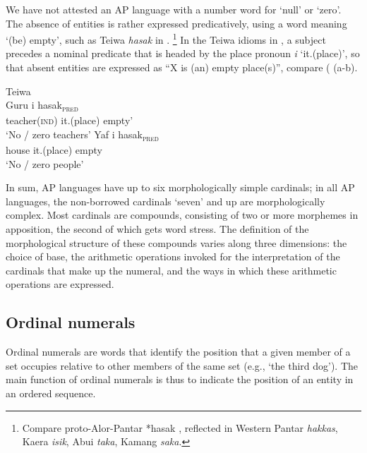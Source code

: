 We have not attested an AP language with a number word for `null' or `zero'. The absence of entities is rather expressed predicatively, using a word meaning `(be) empty', such as Teiwa \textit{hasak} in .
\footnote{Compare proto-Alor-Pantar *hasak \citep{HoltonRobinsonTVhistory}, reflected in Western Pantar \textit{hakkas}, Kaera \textit{isik}, Abui \textit{taka}, Kamang \textit{saka}.} In the Teiwa idioms in , a subject precedes a nominal predicate that is headed by the place pronoun \textit{i} `it.(place)', so that absent entities are expressed as ``X is (an) empty place(s)'', compare ( (a-b).


\ea%
\label{bkm:Ref355363568}
{\upshape Teiwa}\\
\ea
\label{ex:8:1234}
\gll Guru       {\ob}i       hasak{\cb}\textsubscript{\upshape\textsc{pred}} \\  
     teacher\textsc{(ind)}   it.(place)    empty'  \\
\glt  `No / zero teachers' 
\ex
\gll Yaf {\ob}i     hasak{\cb}\textsubscript{\upshape\textsc{pred}} \\
    house      it.(place)   empty\\
\glt    `No / zero people' 
\z
\z

In sum, AP languages have up to six morphologically simple cardinals; in all AP languages, the non-borrowed cardinals `seven' and up are morphologically complex. Most cardinals are compounds, consisting of two or more morphemes in apposition, the second of which gets word stress. The definition of the morphological structure of these compounds varies along three dimensions: the choice of base, the arithmetic operations invoked for the interpretation of the cardinals that make up the numeral, and the ways in which these arithmetic operations are expressed. 

\subsection{Ordinal  numerals}
\label{sec:8:Ordinal}
Ordinal numerals are words that identify the position that a given member of a set occupies relative to other members of the same set (e.g., `the third dog'). The main function of ordinal numerals is thus to indicate the position of an entity in an ordered sequence. 

